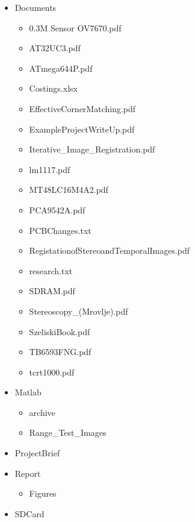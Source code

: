 \begin{itemize}
\item Documents
\begin{itemize}
\item 0.3M Sensor OV7670.pdf
\item AT32UC3.pdf
\item ATmega644P.pdf
\item Costings.xlsx
\item EffectiveCornerMatching.pdf
\item ExampleProjectWriteUp.pdf
\item Iterative\_Image\_Registration.pdf
\item lm1117.pdf
\item MT48LC16M4A2.pdf
\item PCA9542A.pdf
\item PCBChanges.txt
\item RegistationofStereoandTemporalImages.pdf
\item research.txt
\item SDRAM.pdf
\item Stereoscopy\_(Mrovlje).pdf
\item SzeliskiBook.pdf
\item TB6593FNG.pdf
\item tcrt1000.pdf
\end{itemize}
\item Matlab
\begin{itemize}
\item archive
\item Range\_Test\_Images
\end{itemize}
\item ProjectBrief

\item Report
\begin{itemize}
\item Figures
\end{itemize}
\item SDCard
\end{itemize} 
        
